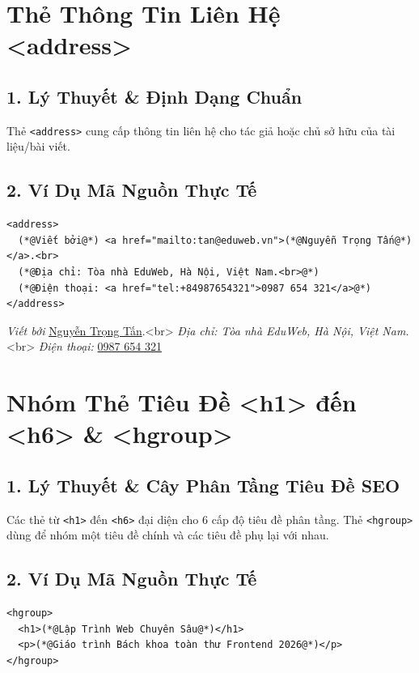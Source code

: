 \documentclass[11pt,oneside]{book}
\newcommand{\codeinline}[1]{\textcolor{accentOrange}{\texttt{#1}}}
\begin{document}
\section{Thẻ Thông Tin Liên Hệ <address>}
\subsection{1. Lý Thuyết \& Định Dạng Chuẩn}
Thẻ \codeinline{<address>} cung cấp thông tin liên hệ cho tác giả hoặc chủ sở hữu của tài liệu/bài viết.

\subsection{2. Ví Dụ Mã Nguồn Thực Tế}
\begin{codeWindow}
\begin{lstlisting}[language=HTML5]
<address>
  (*@Viết bởi@*) <a href="mailto:tan@eduweb.vn">(*@Nguyễn Trọng Tấn@*)</a>.<br>
  (*@Địa chỉ: Tòa nhà EduWeb, Hà Nội, Việt Nam.<br>@*)
  (*@Điện thoại: <a href="tel:+84987654321">0987 654 321</a>@*)
</address>
\end{lstlisting}
\end{codeWindow}

\begin{browserWindow}
\sffamily\small
\textit{Viết bởi} \textcolor{primaryBlue}{\underline{Nguyễn Trọng Tấn}}.<br>
\textit{Địa chỉ: Tòa nhà EduWeb, Hà Nội, Việt Nam.}<br>
\textit{Điện thoại:} \textcolor{primaryBlue}{\underline{0987 654 321}}
\end{browserWindow}

\section{Nhóm Thẻ Tiêu Đề <h1> đến <h6> \& <hgroup>}
\subsection{1. Lý Thuyết \& Cây Phân Tầng Tiêu Đề SEO}
Các thẻ từ \codeinline{<h1>} đến \codeinline{<h6>} đại diện cho 6 cấp độ tiêu đề phân tầng. Thẻ \codeinline{<hgroup>} dùng để nhóm một tiêu đề chính và các tiêu đề phụ lại với nhau.

\subsection{2. Ví Dụ Mã Nguồn Thực Tế}
\begin{codeWindow}
\begin{lstlisting}[language=HTML5]
<hgroup>
  <h1>(*@Lập Trình Web Chuyên Sâu@*)</h1>
  <p>(*@Giáo trình Bách khoa toàn thư Frontend 2026@*)</p>
</hgroup>
\end{lstlisting}
\end{codeWindow}
\end{document}
